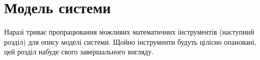 \section{Модель системи}

Наразі триває пропрацювання можливих математичних інструментів (наступний розділ) для опису моделі системи. Щойно інструменти будуть цілісно опановані, цей розділ набуде свого завершального вигляду.